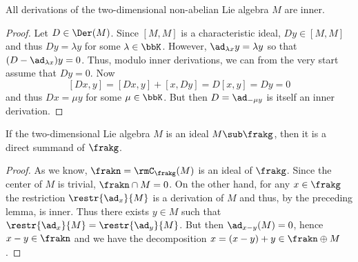 \begin{lem}
    All derivations of the two-dimensional non-abelian Lie algebra $M$ are inner.
\end{lem}
\begin{proof}
    Let $D\in\Der(M)$. Since $[M,M]$ is a characteristic ideal, $Dy\in[M,M]$ and thus $Dy=\lambda y$ for some $\lambda\in\bbK$. However, $\ad_{\lambda x}y=\lambda y$ so that $(D-\ad_{\lambda x})y=0$. Thus, modulo inner derivations, we can from the very start assume that $Dy=0$. Now
    \[[Dx,y]=[Dx,y]+[x,Dy]=D[x,y]=Dy=0\]
    and thus $Dx=\mu y$ for some $\mu\in\bbK$. But then $D=\ad_{-\mu y}$ is itself an inner derivation.
\end{proof}

\begin{lem}\label{lem 2}
    If the two-dimensional Lie algebra $M$ is an ideal $M\sub \frakg$, then it is a direct summand of $\frakg$.
\end{lem}
\begin{proof}
    As we know, $\frakn=\rmC_\frakg(M)$ is an ideal of $\frakg$. Since the center of $M$ is trivial, $\frakn\cap M=0$. On the other hand, for any $x\in\frakg$ the restriction $\restr{\ad_x}{M}$ is a derivation of $M$ and thus, by the preceding lemma, is inner. Thus there exists $y\in M$ such that $\restr{\ad_x}{M}=\restr{\ad_y}{M}$. But then $\ad_{x-y}(M)=0$, hence $x-y\in \frakn$ and we have the decomposition $x=(x-y)+y\in \frakn\oplus M$.
\end{proof}



